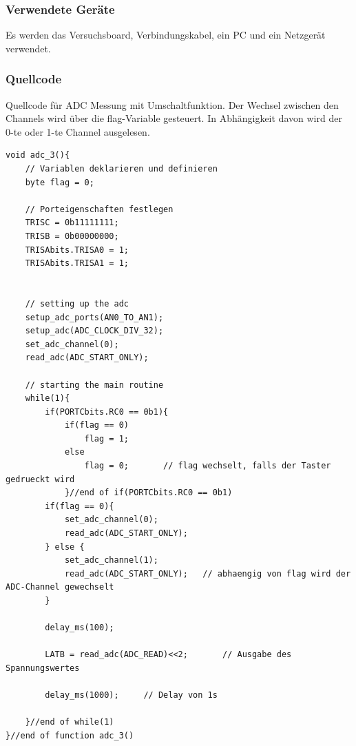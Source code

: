 \documentclass[12pt,a4paper]{article}
\begin{document}
\subsubsection*{Verwendete Geräte}

Es werden das Versuchsboard, Verbindungskabel, ein PC und ein Netzgerät verwendet.

\subsubsection*{Quellcode}

Quellcode für ADC Messung mit Umschaltfunktion. Der Wechsel zwischen den Channels wird über die flag-Variable gesteuert. In Abhängigkeit davon wird der 0-te oder 1-te Channel ausgelesen.

\lstset{language=C, basicstyle=\tiny}
\begin{lstlisting}[caption = {ADC mit Umschaltfunktion}, label=lst:g_15,captionpos=b]
void adc_3(){
	// Variablen deklarieren und definieren
	byte flag = 0;

	// Porteigenschaften festlegen
	TRISC = 0b11111111;
	TRISB = 0b00000000;
	TRISAbits.TRISA0 = 1;
	TRISAbits.TRISA1 = 1;
	
	
	// setting up the adc
	setup_adc_ports(AN0_TO_AN1);
	setup_adc(ADC_CLOCK_DIV_32);
	set_adc_channel(0);
	read_adc(ADC_START_ONLY);
	
	// starting the main routine
	while(1){
		if(PORTCbits.RC0 == 0b1){
			if(flag == 0)
				flag = 1;
			else
				flag = 0;		// flag wechselt, falls der Taster gedrueckt wird
			}//end of if(PORTCbits.RC0 == 0b1)
		if(flag == 0){
			set_adc_channel(0);
			read_adc(ADC_START_ONLY);
		} else {
			set_adc_channel(1);
			read_adc(ADC_START_ONLY);	// abhaengig von flag wird der ADC-Channel gewechselt	
		}
		
		delay_ms(100);
		
		LATB = read_adc(ADC_READ)<<2;		// Ausgabe des Spannungswertes
		
		delay_ms(1000);		// Delay von 1s
				
	}//end of while(1)
}//end of function adc_3()
\end{lstlisting}
\end{document}
